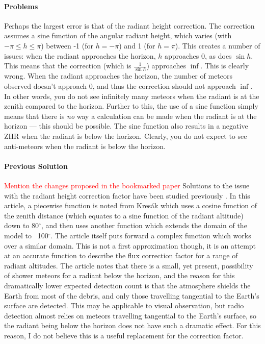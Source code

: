 \paragraph{Problems}
Perhaps the largest error is that of the radiant height correction. The correction assumes a sine function of the angular radiant height, which varies (with $-\pi \leq h \leq \pi$) between -1 (for $h = -\pi$) and 1 (for $h = \pi$). This creates a number of issues: when the radiant approaches the horizon, $h$ approaches 0, as does $\sin h$. This means that the correction (which is $\frac{1}{\sin h}$) approaches $\inf$. This is clearly wrong. When the radiant approaches the horizon, the number of meteors observed doesn't approach 0, and thus the correction should not approach $\inf$. In other words, you do not see infinitely many meteors when the radiant is at the zenith compared to the horizon. Further to this, the use of a sine function simply means that there is \textit{no} way a calculation can be made when the radiant is at the horizon --- this should be possible. The sine function also results in a negative ZHR when the radiant is below the horizon. Clearly, you do not expect to see anti-meteors when the radiant is below the horizon. 

\paragraph{Previous Solution}
\textcolor{red}{Mention the changes proposed in the bookmarked paper}
Solutions to the issue with the radiant height correction factor have been studied previously \cite{hr_correction}. In this article, a piecewise function is noted from Kres\'{a}k \cite{kresak} which uses a cosine function of the zenith distance (which equates to a sine function of the radiant altitude) down to 80$^{\circ}$, and then uses another function which extends the domain of the model to ~100$^{\circ}$. The article itself puts forward a complex function which works over a similar domain. This is not a first approximation though, it is an attempt at an accurate function to describe the flux correction factor for a range of radiant altitudes. The article notes that there is a small, yet present, possibility of shower meteors for a radiant below the horizon, and the reason for this dramatically lower expected detection count is that the atmosphere shields the Earth from most of the debris, and only those travelling tangential to the Earth's surface are detected. This may be applicable to visual observation, but radio detection almost relies on meteors travelling tangential to the Earth's surface, so the radiant being below the horizon does not have such a dramatic effect. For this reason, I do not believe this is a useful replacement for the correction factor.

